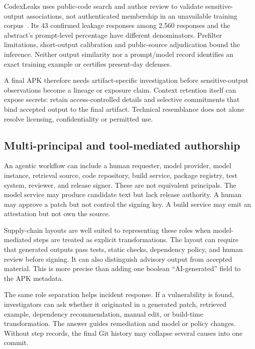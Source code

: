 CodexLeaks uses public-code search and author review to validate sensitive-output associations, not authenticated membership in an unavailable training corpus~\cite{codexleaks}. Its 43 confirmed leakage responses among 2,560 responses and the abstract's prompt-level percentage have different denominators. Prefilter limitations, short-output calibration and public-source adjudication bound the inference. Neither output similarity nor a prompt/model record identifies an exact training example or certifies present-day defenses.

A final APK therefore needs artifact-specific investigation before sensitive-output observations become a lineage or exposure claim. Context retention itself can expose secrets: retain access-controlled details and selective commitments that bind accepted output to the final artifact. Technical resemblance does not alone resolve licensing, confidentiality or permitted use.

\subsection{Multi-principal and tool-mediated authorship}

An agentic workflow can include a human requester, model provider, model instance, retrieval source, code repository, build service, package registry, test system, reviewer, and release signer. These are not equivalent principals. The model service may produce candidate text but lack release authority. A human may approve a patch but not control the signing key. A build service may emit an attestation but not own the source.

Supply-chain layouts are well suited to representing these roles when model-mediated steps are treated as explicit transformations. The layout can require that generated outputs pass tests, static checks, dependency policy, and human review before signing. It can also distinguish advisory output from accepted material. This is more precise than adding one boolean ``AI-generated'' field to the APK metadata.

The same role separation helps incident response. If a vulnerability is found, investigators can ask whether it originated in a generated patch, retrieved example, dependency recommendation, manual edit, or build-time transformation. The answer guides remediation and model or policy changes. Without step records, the final Git history may collapse several causes into one commit.

